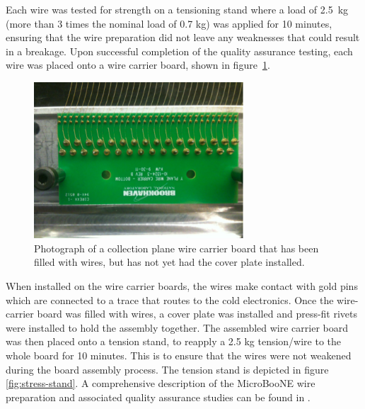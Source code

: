 Each wire was tested for strength on a tensioning stand where a load of 2.5~kg (more than 3 times the nominal load of 0.7 kg) was applied for 10 minutes, ensuring that the wire preparation did not leave any weaknesses that could result in a breakage.  Upon successful completion of the quality assurance testing, each wire was placed onto a wire carrier board, shown in figure~\ref{fig:carrier-boards}.


\begin{figure}
\centering
\includegraphics[angle =0,width=0.7\textwidth]{figures/wire-carrierboard.png}
\caption{Photograph of a collection plane wire carrier board that has been filled with wires, but has not yet had the cover plate installed.}
\label{fig:carrier-boards}
\end{figure}


When installed on the wire carrier boards, the wires make contact with gold pins which are connected to a trace that routes to the cold electronics.  Once the wire-carrier board was filled with wires, a cover plate was installed and press-fit rivets were installed to hold the assembly together. The assembled wire carrier board was then placed onto a tension stand, to reapply a 2.5 kg tension/wire to the whole board for 10 minutes. This is to ensure that the wires were not weakened during the board assembly process. The tension stand is depicted in figure \ref{fig:stress-stand}.   A comprehensive description of the MicroBooNE wire preparation and associated quality assurance studies can be found in \cite{Acciarri:2016ugk}.

